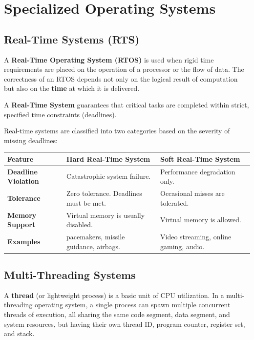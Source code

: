 \documentclass[12pt,a4paper]{article}
\begin{document}
\section{Specialized Operating Systems}

\subsection{Real-Time Systems (RTS)}
A \textbf{Real-Time Operating System (RTOS)} is used when rigid time requirements are placed on the operation of a processor or the flow of data. The correctness of an RTOS depends not only on the logical result of computation but also on the \textbf{time} at which it is delivered.

\begin{tcolorbox}[defbox, title={\textbf{Definition: Real-Time Systems}}]
A \textbf{Real-Time System} guarantees that critical tasks are completed within strict, specified time constraints (deadlines).
\end{tcolorbox}

Real-time systems are classified into two categories based on the severity of missing deadlines:\par\noindent
\begin{tabularx}{\linewidth}{|B{3.2cm}|Y|Y|}
\hline
\textbf{Feature} & \textbf{\color{myred}Hard Real-Time System} & \textbf{\color{myteal}Soft Real-Time System} \\
\hline
\textbf{Deadline Violation} & Catastrophic system failure. & Performance degradation only. \\
\hline
\textbf{Tolerance} & Zero tolerance. Deadlines must be met. & Occasional misses are tolerated. \\
\hline
\textbf{Memory Support} & Virtual memory is usually disabled. & Virtual memory is allowed. \\
\hline
\textbf{Examples} & pacemakers, missile guidance, airbags. & Video streaming, online gaming, audio. \\
\hline
\end{tabularx}

\subsection{Multi-Threading Systems}
A \textbf{thread} (or lightweight process) is a basic unit of CPU utilization. In a multi-threading operating system, a single process can spawn multiple concurrent threads of execution, all sharing the same code segment, data segment, and system resources, but having their own thread ID, program counter, register set, and stack.
\end{document}
